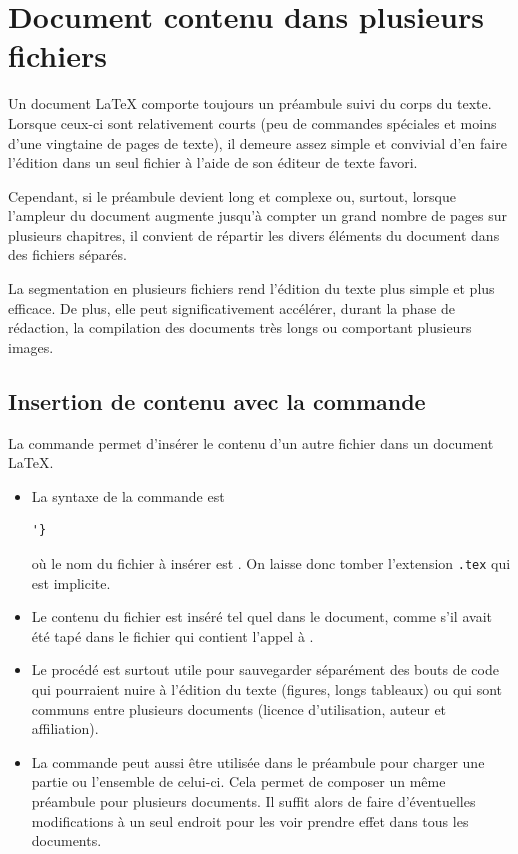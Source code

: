 \chapter{Document contenu dans plusieurs fichiers}
\label{chap:include}

Un document {\LaTeX} comporte toujours un préambule suivi du corps du
texte. Lorsque ceux-ci sont relativement courts (peu de commandes
spéciales et moins d'une vingtaine de pages de texte), il demeure
assez simple et convivial d'en faire l'édition dans un seul fichier à
l'aide de son éditeur de texte favori.

Cependant, si le préambule devient long et complexe ou, surtout,
lorsque l'ampleur du document augmente jusqu'à compter un grand nombre
de pages sur plusieurs chapitres, il convient de répartir les divers
éléments du document dans des fichiers séparés.

La segmentation en plusieurs fichiers rend l'édition du texte plus
simple et plus efficace. De plus, elle peut significativement
accélérer, durant la phase de rédaction, la compilation des documents
très longs ou comportant plusieurs images.


\section{Insertion de contenu avec la commande }
\label{sec:include:input}

La commande \cmd{} permet d'insérer le contenu d'un autre fichier
dans un document {\LaTeX}.
\begin{itemize}
\item La syntaxe de la commande est
\begin{lstlisting}
'}
\end{lstlisting}
  où le nom du fichier à insérer est . On
  laisse donc tomber l'extension \verb=.tex= qui est implicite.
\item Le contenu du fichier est inséré tel quel dans le document,
  comme s'il avait été tapé dans le fichier qui contient l'appel à
  \cmd{}.
\item Le procédé est surtout utile pour sauvegarder séparément des
  bouts de code qui pourraient nuire à l'édition du texte (figures,
  longs tableaux) ou qui sont communs entre plusieurs documents
  (licence d'utilisation, auteur et affiliation).
\item La commande peut aussi être utilisée dans le préambule pour
  charger une partie ou l'ensemble de celui-ci. Cela permet de
  composer un même préambule pour plusieurs documents. Il
  suffit alors de faire d'éventuelles modifications à un seul endroit pour
  les voir prendre effet dans tous les documents.
\end{itemize}


